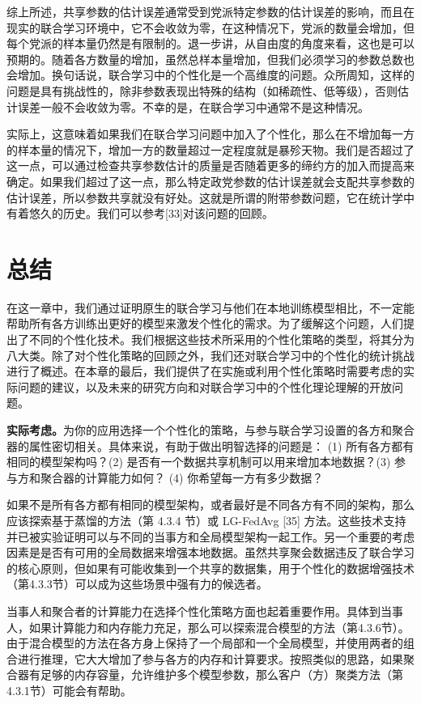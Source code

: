 综上所述，共享参数的估计误差通常受到党派特定参数的估计误差的影响，而且在现实的联合学习环境中，它不会收敛为零，在这种情况下，党派的数量会增加，但每个党派的样本量仍然是有限制的。退一步讲，从自由度的角度来看，这也是可以预期的。随着各方数量的增加，虽然总样本量增加，但我们必须学习的参数总数也会增加。换句话说，联合学习中的个性化是一个高维度的问题。众所周知，这样的问题是具有挑战性的，除非参数表现出特殊的结构（如稀疏性、低等级），否则估计误差一般不会收敛为零。不幸的是，在联合学习中通常不是这种情况。

实际上，这意味着如果我们在联合学习问题中加入了个性化，那么在不增加每一方的样本量的情况下，增加一方的数量超过一定程度就是暴殄天物。我们是否超过了这一点，可以通过检查共享参数估计的质量是否随着更多的缔约方的加入而提高来确定。如果我们超过了这一点，那么特定政党参数的估计误差就会支配共享参数的估计误差，所以参数共享就没有好处。这就是所谓的附带参数问题，它在统计学中有着悠久的历史。我们可以参考[33]对该问题的回顾。

\section{总结}
在这一章中，我们通过证明原生的联合学习与他们在本地训练模型相比，不一定能帮助所有各方训练出更好的模型来激发个性化的需求。为了缓解这个问题，人们提出了不同的个性化技术。我们根据这些技术所采用的个性化策略的类型，将其分为八大类。除了对个性化策略的回顾之外，我们还对联合学习中的个性化的统计挑战进行了概述。在本章的最后，我们提供了在实施或利用个性化策略时需要考虑的实际问题的建议，以及未来的研究方向和对联合学习中的个性化理论理解的开放问题。

\textbf{实际考虑。}为你的应用选择一个个性化的策略，与参与联合学习设置的各方和聚合器的属性密切相关。具体来说，有助于做出明智选择的问题是： (1) 所有各方都有相同的模型架构吗？(2) 是否有一个数据共享机制可以用来增加本地数据？(3) 参与方和聚合器的计算能力如何？ (4) 你希望每一方有多少数据？

如果不是所有各方都有相同的模型架构，或者最好是不同各方有不同的架构，那么应该探索基于蒸馏的方法（第 4.3.4 节）或 LG-FedAvg [35] 方法。这些技术支持并已被实验证明可以与不同的当事方和全局模型架构一起工作。另一个重要的考虑因素是是否有可用的全局数据来增强本地数据。虽然共享聚会数据违反了联合学习的核心原则，但如果有可能收集到一个共享的数据集，用于个性化的数据增强技术（第4.3.3节）可以成为这些场景中强有力的候选者。

当事人和聚合者的计算能力在选择个性化策略方面也起着重要作用。具体到当事人，如果计算能力和内存能力充足，那么可以探索混合模型的方法（第4.3.6节）。由于混合模型的方法在各方身上保持了一个局部和一个全局模型，并使用两者的组合进行推理，它大大增加了参与各方的内存和计算要求。按照类似的思路，如果聚合器有足够的内存容量，允许维护多个模型参数，那么客户（方）聚类方法（第4.3.1节）可能会有帮助。

